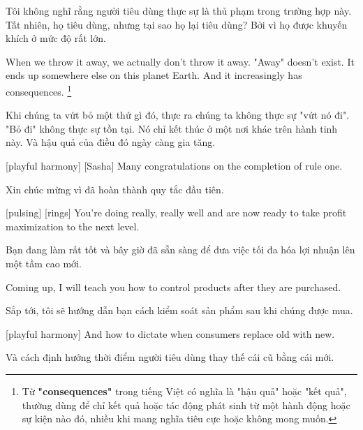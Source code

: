 \documentclass[a4paper]{article}
\begin{document}
	\begin{vietnamese-v2}
		 Tôi không nghĩ rằng người tiêu dùng thực sự là thủ phạm trong trường hợp này. 
		Tất nhiên, họ tiêu dùng, nhưng tại sao họ lại tiêu dùng? 
		Bởi vì họ được khuyến khích ở mức độ rất lớn.
	\end{vietnamese-v2}
	
	When we throw it away, we actually don't throw it away.
	"Away" doesn't exist.
	It ends up somewhere else on this planet Earth.
	And it increasingly has consequences. \footnote{
		Từ \textbf{"consequences"} trong tiếng Việt có nghĩa là "hậu quả" hoặc "kết quả", thường dùng để chỉ kết quả hoặc tác động phát sinh từ một hành động hoặc sự kiện nào đó, nhiều khi mang nghĩa tiêu cực hoặc không mong muốn. 
	}
	
	\begin{vietnamese-v2}
		Khi chúng ta vứt bỏ một thứ gì đó, thực ra chúng ta không thực sự "vứt nó đi". 
		"Bỏ đi" không thực sự tồn tại. 
		Nó chỉ kết thúc ở một nơi khác trên hành tinh này. 
		Và hậu quả của điều đó ngày càng gia tăng.
	\end{vietnamese-v2}
	
	[playful harmony]
	[Sasha] Many congratulations on the completion of rule one.
	
	\begin{vietnamese-v2}
		 Xin chúc mừng vì đã hoàn thành quy tắc đầu tiên.
	\end{vietnamese-v2}
	
	[pulsing]
	[rings]
	You're doing really, really well and are now ready to take profit maximization to the next level.
	
	\begin{vietnamese-v2}
		Bạn đang làm rất tốt và bây giờ đã sẵn sàng để đưa việc tối đa hóa lợi nhuận lên một tầm cao mới.
	\end{vietnamese-v2}
	
	Coming up, I will teach you how to control products after they are purchased.
	
	\begin{vietnamese-v2}
		Sắp tới, tôi sẽ hướng dẫn bạn cách kiểm soát sản phẩm sau khi chúng được mua.
	\end{vietnamese-v2}
	
	[playful harmony]
	And how to dictate when consumers replace old with new.
	
	\begin{vietnamese-v2}
		Và cách định hướng thời điểm người tiêu dùng thay thế cái cũ bằng cái mới.
	\end{vietnamese-v2}
	
\end{document}
